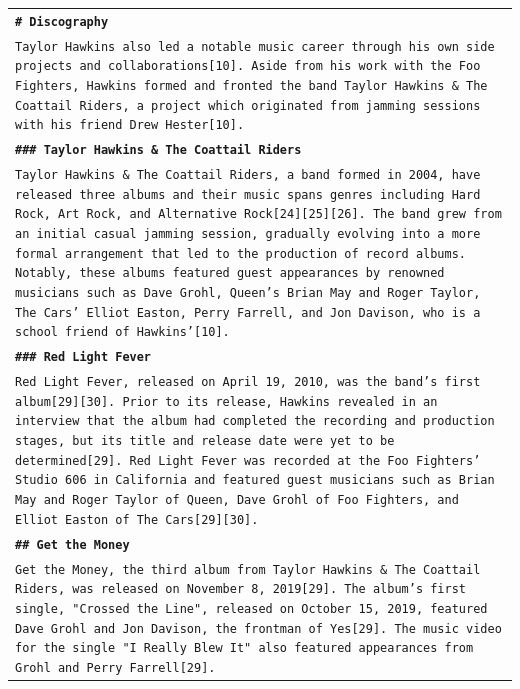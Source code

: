 \begin{longtable}{p{\textwidth}}
\vspace{1pt}
\texttt{\small{\textbf{\# Discography}}} \\
\texttt{\small{Taylor Hawkins also led a notable music career through his own side projects and collaborations[10]. Aside from his work with the Foo Fighters, Hawkins formed and fronted the band Taylor Hawkins \& The Coattail Riders, a project which originated from jamming sessions with his friend Drew Hester[10].}} \\
\vspace{1pt}
\texttt{\small{\textbf{\#\#\# Taylor Hawkins \& The Coattail Riders}}} \\
\texttt{\small{Taylor Hawkins \& The Coattail Riders, a band formed in 2004, have released three albums and their music spans genres including Hard Rock, Art Rock, and Alternative Rock[24][25][26]. The band grew from an initial casual jamming session, gradually evolving into a more formal arrangement that led to the production of record albums. Notably, these albums featured guest appearances by renowned musicians such as Dave Grohl, Queen's Brian May and Roger Taylor, The Cars' Elliot Easton, Perry Farrell, and Jon Davison, who is a school friend of Hawkins'[10].}} \\
\vspace{1pt}
\texttt{\small{\textbf{\#\#\# Red Light Fever}}} \\
\texttt{\small{Red Light Fever, released on April 19, 2010, was the band's first album[29][30]. Prior to its release, Hawkins revealed in an interview that the album had completed the recording and production stages, but its title and release date were yet to be determined[29]. Red Light Fever was recorded at the Foo Fighters' Studio 606 in California and featured guest musicians such as Brian May and Roger Taylor of Queen, Dave Grohl of Foo Fighters, and Elliot Easton of The Cars[29][30].}} \\
\vspace{1pt}
\texttt{\small{\textbf{\#\# Get the Money}}} \\
\texttt{\small{Get the Money, the third album from Taylor Hawkins \& The Coattail Riders, was released on November 8, 2019[29]. The album's first single, "Crossed the Line", released on October 15, 2019, featured Dave Grohl and Jon Davison, the frontman of Yes[29]. The music video for the single "I Really Blew It" also featured appearances from Grohl and Perry Farrell[29].}} \\


\end{longtable}
